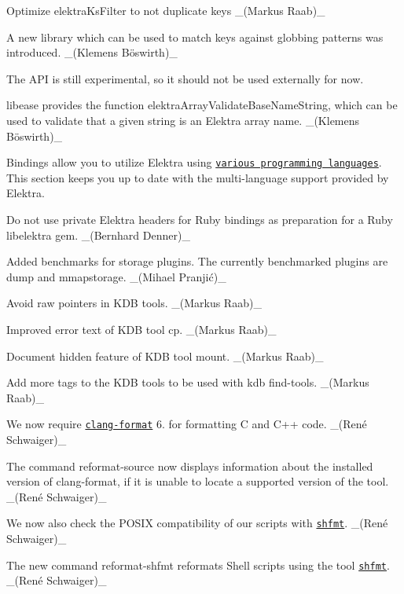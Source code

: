 Optimize elektra\+Ks\+Filter to not duplicate keys \+\_\+(\+Markus Raab)\+\_\+

A new library which can be used to match keys against globbing patterns was introduced. \+\_\+(Klemens Böswirth)\+\_\+

The A\+PI is still experimental, so it should not be used externally for now.

{\ttfamily libease} provides the function {\ttfamily elektra\+Array\+Validate\+Base\+Name\+String}, which can be used to validate that a given string is an Elektra array name. \+\_\+(Klemens Böswirth)\+\_\+

Bindings allow you to utilize Elektra using \href{https://www.libelektra.org/bindings/readme}{\tt various programming languages}. This section keeps you up to date with the multi-\/language support provided by Elektra.

Do not use private Elektra headers for Ruby bindings as preparation for a Ruby {\ttfamily libelektra} gem. \+\_\+(\+Bernhard Denner)\+\_\+


\begin{DoxyItemize}
\item Added benchmarks for storage plugins. The currently benchmarked plugins are {\ttfamily dump} and {\ttfamily mmapstorage}. \+\_\+(Mihael Pranjić)\+\_\+
\item Avoid raw pointers in K\+DB tools. \+\_\+(\+Markus Raab)\+\_\+
\item Improved error text of K\+DB tool {\ttfamily cp}. \+\_\+(\+Markus Raab)\+\_\+
\item Document hidden feature of K\+DB tool {\ttfamily mount}. \+\_\+(\+Markus Raab)\+\_\+
\item Add more tags to the K\+DB tools to be used with {\ttfamily kdb find-\/tools}. \+\_\+(\+Markus Raab)\+\_\+
\end{DoxyItemize}


\begin{DoxyItemize}
\item We now require \href{https://clang.llvm.org/docs/ClangFormat.html}{\tt {\ttfamily clang-\/format}} 6. for formatting C and C++ code. \+\_\+(René Schwaiger)\+\_\+
\item The command {\ttfamily reformat-\/source} now displays information about the installed version of {\ttfamily clang-\/format}, if it is unable to locate a supported version of the tool. \+\_\+(René Schwaiger)\+\_\+
\item We now also check the P\+O\+S\+IX compatibility of our scripts with \href{https://github.com/mvdan/sh}{\tt {\ttfamily shfmt}}. \+\_\+(René Schwaiger)\+\_\+
\item The new command {\ttfamily reformat-\/shfmt} reformats Shell scripts using the tool \href{https://github.com/mvdan/sh}{\tt {\ttfamily shfmt}}. \+\_\+(René Schwaiger)\+\_\+
\end{DoxyItemize}


